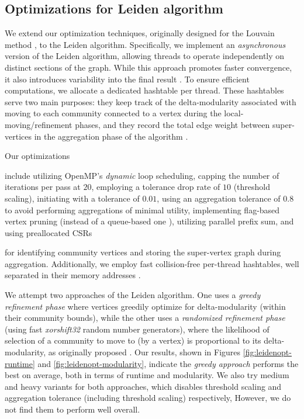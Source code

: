\subsection{Optimizations for Leiden algorithm}
\label{sec:leiden}

We extend our optimization techniques, originally designed for the Louvain method \cite{sahu2023gvelouvain}, to the Leiden algorithm. Specifically, we implement an \textit{asynchronous} version of the Leiden algorithm, allowing threads to operate independently on distinct sections of the graph. While this approach promotes faster convergence, it also introduces variability into the final result \cite{com-shi21}. To ensure efficient computations, we allocate a dedicated hashtable per thread. These hashtables serve two main purposes: they keep track of the delta-modularity associated with moving to each community connected to a vertex during the local-moving/refinement phases, and they record the total edge weight between super-vertices in the aggregation phase of the algorithm \cite{sahu2023gvelouvain}.

Our optimizations include utilizing OpenMP's \textit{dynamic} loop scheduling, capping the number of iterations per pass at $20$, employing a tolerance drop rate of $10$ (threshold scaling), initiating with a tolerance of $0.01$, using an aggregation tolerance of $0.8$ to avoid performing aggregations of minimal utility, implementing flag-based vertex pruning (instead of a queue-based one \cite{nguyenleiden}), utilizing parallel prefix sum, and using preallocated CSRs for identifying community vertices and storing the super-vertex graph during aggregation. Additionally, we employ fast collision-free per-thread hashtables, well separated in their memory addresses \cite{sahu2023gvelouvain}.

We attempt two approaches of the Leiden algorithm. One uses a \textit{greedy refinement phase} where vertices greedily optimize for delta-modularity (within their community bounds), while the other uses a \textit{randomized refinement phase} (using fast \textit{xorshift32} random number generators), where the likelihood of selection of a community to move to (by a vertex) is proportional to its delta-modularity, as originally proposed \cite{com-traag19}. Our results, shown in Figures \ref{fig:leidenopt-runtime} and \ref{fig:leidenopt-modularity}, indicate the \textit{greedy approach} performs the best on average, both in terms of runtime and modularity. We also try medium and heavy variants for both approaches, which disables threshold scaling and aggregation tolerance (including threshold scaling) respectively, However, we do not find them to perform well overall.

